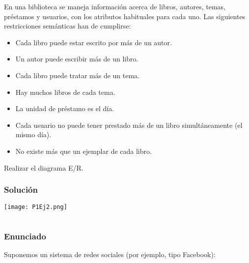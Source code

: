 En una biblioteca se maneja información acerca de libros, autores, temas, préstamos y usuarios, con los atributos habituales para cada uno.
Las siguientes restricciones semánticas han de cumplirse:

\begin{itemize}
	\item Cada libro puede estar escrito por más de un autor.
	\item Un autor puede escribir más de un libro.
	\item Cada libro puede tratar más de un tema.
	\item Hay muchos libros de cada tema.
	\item La unidad de préstamo es el día.
	\item Cada usuario no puede tener prestado más de un libro simultáneamente (el mismo día).
	\item No existe más que un ejemplar de cada libro.
\end{itemize}

Realizar el diagrama E/R.

\subsubsection{Solución}

\begin{center}
	\texttt{[image: P1Ej2.png]}
\end{center}

\setcounter{section}{16}

\section{}\label{ej1-17}

\subsubsection{Enunciado}

Suponemos un sistema de redes sociales (por ejemplo, tipo Facebook):


